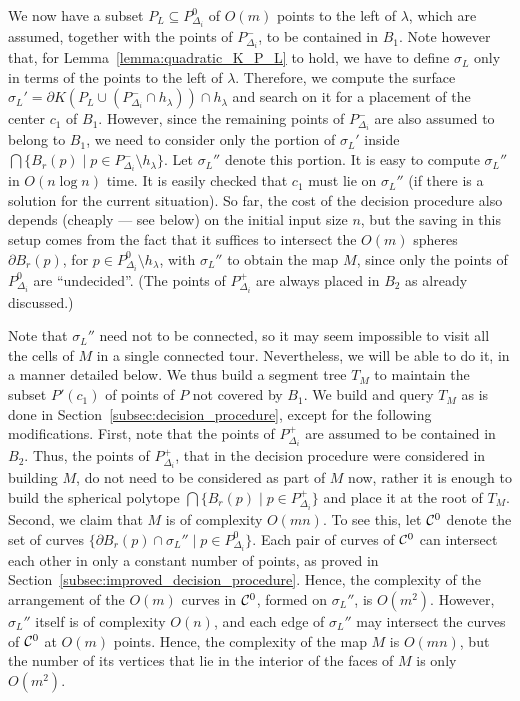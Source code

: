 \documentclass[a4paper,12pt]{article}
\def\C{{\cal C}}
\def\bd{{\partial}}
\begin{document}
We now have a subset $P_L \subseteq P_{\Delta_i}^0$ of $O(m)$ points
to the left of $\lambda$, which are assumed, together with the
points of $P_{\Delta_i}^-$, to be contained in $B_1$. Note however
that, for Lemma~\ref{lemma:quadratic_K_P_L} to hold, we have to
define $\sigma_L$ only in terms of the points to the left of
$\lambda$. Therefore, we compute the surface $\sigma_L' = \bd{K(P_L
\cup (P_{\Delta_i}^- \cap h_\lambda)) \cap h_\lambda}$ and search on
it for a placement of the center $c_1$ of $B_1$. However, since the
remaining points of $P_{\Delta_i}^-$ are also assumed to belong to
$B_1$, we need to consider only the portion of $\sigma_L'$ inside
$\bigcap\{B_r(p) \mid p \in P_{\Delta_i}^- \setminus h_\lambda\}$.
Let $\sigma_L''$ denote this portion. It is easy to compute
$\sigma_L''$ in $O(n \log n)$ time. It is easily checked that $c_1$
must lie on $\sigma_L''$ (if there is a solution for the current
situation). So far, the cost of the decision procedure also depends
(cheaply --- see below) on the initial input size $n$, but the
saving in this setup comes from the fact that it suffices to
intersect the $O(m)$ spheres $\bd{B_r(p)}$, for $p \in
P_{\Delta_i}^0 \setminus h_\lambda$, with $\sigma_L''$ to obtain the
map $M$, since only the points of $P_{\Delta_i}^0$ are
``undecided''. (The points of $P_{\Delta_i}^+$ are always placed in
$B_2$ as already discussed.)

Note that $\sigma_L''$ need not to be connected, so it may seem
impossible to visit all the cells of $M$ in a single connected tour.
Nevertheless, we will be able to do it, in a manner detailed below.
We thus build a segment tree $T_M$ to maintain the subset $P'(c_1)$
of points of $P$ not covered by $B_1$. We build and query $T_M$ as
is done in Section~\ref{subsec:decision_procedure}, except for the
following modifications. First, note that the points of
$P_{\Delta_i}^+$ are assumed to be contained in $B_2$. Thus, the
points of $P_{\Delta_i}^+$, that in the decision procedure were
considered in building $M$, do not need to be considered as part of
$M$ now, rather it is enough to build the spherical polytope
$\bigcap \{B_r(p) \mid p \in P_{\Delta_i}^+ \}$ and place it at the
root of $T_M$. Second, we claim that $M$ is of complexity $O(m n)$.
To see this, let $\C^0$ denote the set of curves $\{\bd{B_r(p)} \cap
\sigma_L'' \mid p \in P_{\Delta_i}^0\}$. Each pair of curves of
$\C^0$ can intersect each other in only a constant number of points,
as proved in Section~\ref{subsec:improved_decision_procedure}.
Hence, the complexity of the arrangement of the $O(m)$ curves in
$\C^0$, formed on $\sigma_L''$, is $O(m^2)$. However, $\sigma_L''$
itself is of complexity $O(n)$, and each edge of $\sigma_L''$ may
intersect the curves of $\C^0$ at $O(m)$ points. Hence, the
complexity of the map $M$ is $O(m n)$, but the number of its
vertices that lie in the interior of the faces of $M$ is only
$O(m^2)$.
\end{document}
